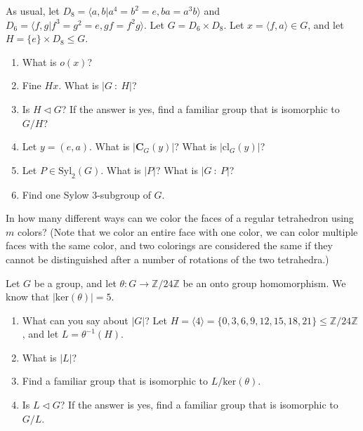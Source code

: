 \documentclass[12pt,letterpaper,boxed]{hmcpset}
\begin{document}

\begin{problem}[10.3.7]
As usual, let $D_8 = \langle a,b \vert a^4 = b^2 = e, ba = a^3b \rangle$ and $D_6 = \langle f,g \vert f^3 = g^2 = e, gf = f^2g \rangle$. Let $G = D_6 \times D_8$. Let $x = \langle f,a \rangle \in G$, and let $H = \{ e \} \times D_8 \leq G$.
\begin{enumerate}[label=\alph*]
\item What is $o(x)$?
\item Fine $Hx$. What is $\vert G \ : \ H \vert$?
\item Is $H \triangleleft G$? If the answer is yes, find a familiar group that is isomorphic to $G/H$?
\item Let $y = (e,a)$. What is $\vert \textbf{C}_G(y) \vert$? What is $\vert \text{cl}_G(y) \vert$?
\item Let $P \in \text{Syl}_2(G)$. What is $\vert P \vert$? What is $\vert G \ : \ P \vert$?
\item Find one Sylow 3-subgroup of $G$.
\end{enumerate}
\end{problem}

\begin{solution}
\end{solution}

\clearpage

\begin{problem}[11.4.9]
In how many different ways can we color the faces of a regular tetrahedron using $m$ colors? (Note that we color an entire face with one color, we can color multiple faces with the same color, and two colorings are considered the same if they cannot be distinguished after a number of rotations of the two tetrahedra.)
\end{problem}

\begin{solution}
\end{solution}

\clearpage

\begin{problem}[11.5.2]
Let $G$ be a group, and let $\theta: G \rightarrow \mathbb{Z}/24\mathbb{Z}$ be an onto group homomorphism. We know that $\vert \text{ker}(\theta) \vert = 5$.
\begin{enumerate}[label=\alph*]
\item What can you say about $\vert G \vert$?
\newline
\newline
{\setlength{\parindent}{0cm}
Let $H = \langle 4 \rangle = \{0,3,6,9,12,15,18,21\} \leq \mathbb{Z}/24\mathbb{Z}$, and let $L = \theta^{-1}(H)$.
}
\item What is $\vert L \vert$?
\item Find a familiar group that is isomorphic to $L/\text{ker}(\theta)$.
\item Is $L \triangleleft G$? If the answer is yes, find a familiar group that is isomorphic to $G/L$.
\end{enumerate}
\end{problem}
\end{document}
